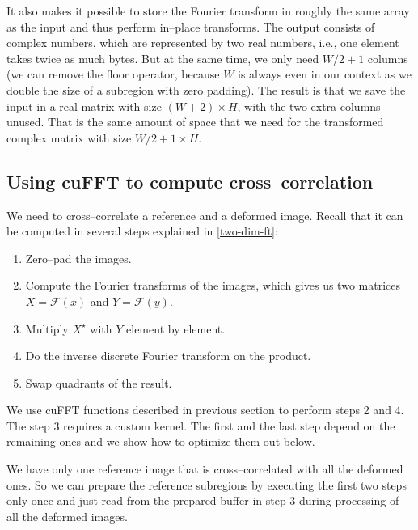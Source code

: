 It also makes it possible to store the Fourier transform in roughly the same array as the input and thus perform in--place transforms. The output consists of complex numbers, which are represented by two real numbers, i.e., one element takes twice as much bytes. But at the same time, we only need $W/2 + 1$ columns (we can remove the floor operator, because $W$ is always even in our context as we double the size of a subregion with zero padding). The result is that we save the input in a real matrix with size $(W+2) \times H$, with the two extra columns unused. That is the same amount of space that we need for the transformed complex matrix with size $W/2 + 1 \times H$.

\subsection{Using cuFFT to compute cross--correlation}

We need to cross--correlate a reference and a deformed image. Recall that it can be computed in several steps explained in \cref{two-dim-ft}:

\begin{enumerate}
	\item Zero--pad the images.
	\item Compute the Fourier transforms of the images, which gives us two matrices $X = \mathcal{F}(x)$ and $Y =\mathcal{F}(y)$.
	\item Multiply $X^\star$ with $Y$ element by element.
	\item Do the inverse discrete Fourier transform on the product.
	\item Swap quadrants of the result.
\end{enumerate}

We use cuFFT functions described in previous section to perform steps 2 and 4. The step 3 requires a custom kernel. The first and the last step depend on the remaining ones and we show how to optimize them out below.

We have only one reference image that is cross--correlated with all the deformed ones. So we can prepare the reference subregions by executing the first two steps only once and just read from the prepared buffer in step 3 during processing of all the deformed images. 

